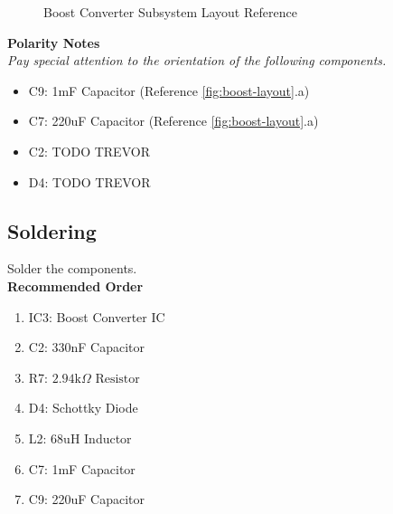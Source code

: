 \documentclass{article}
\newcommand{\resistor}[1]{$\text{#1} \Omega \text{ Resistor}$}
\begin{document}
\begin{figure}[H]
    \centering
        \qquad
        \caption{Boost Converter Subsystem Layout Reference}%
    \label{fig:boost-layout}%
\end{figure}

\noindent \textbf{Polarity Notes}\\
\noindent \textit{Pay special attention to the orientation of the following components.}
\begin{itemize}
  \item C9: 1mF Capacitor (Reference \autoref{fig:boost-layout}.a)
  \item C7: 220uF Capacitor (Reference \autoref{fig:boost-layout}.a)
  \item C2: TODO TREVOR
  \item D4: TODO TREVOR
\end{itemize}

\subsection{Soldering}

Solder the components. \\

\noindent \textbf{Recommended Order}

\begin{enumerate}
  \item IC3: Boost Converter IC 
  \item C2: 330nF Capacitor
  \item R7: \resistor{2.94k}
  \item D4: Schottky Diode 
  \item L2: 68uH Inductor
  \item C7: 1mF Capacitor
  \item C9: 220uF Capacitor
\end{enumerate}
\end{document}
